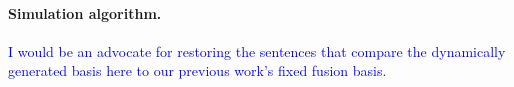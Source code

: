 \documentclass[aps, prl, letterpaper, twocolumn, superscriptaddress, notitlepage, 10pt]{revtex4}
\newcommand{\cggb}[1]{\textcolor{blue}{#1}}
\begin{document}

\paragraph{Simulation algorithm.}


\cggb{I would be an advocate for restoring the sentences that compare the dynamically generated basis here to our previous work's fixed fusion basis.}
\end{document}
